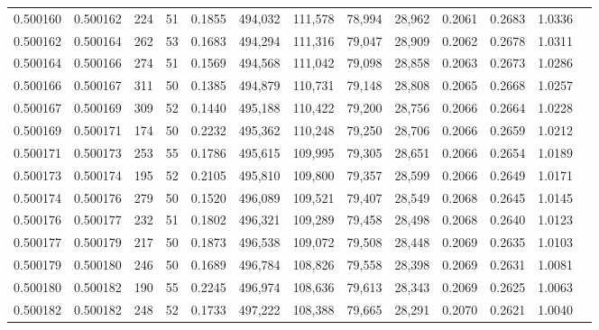 \begin{tabular}{rrrrrrrrrrrrr}
0.500160 & 0.500162 & 224 &  51 &                                     0.1855 & 494,032 & 111,578 &  78,994 &  28,962 & 0.2061 & 0.2683 & 1.0336 \\
0.500162 & 0.500164 & 262 &  53 &                                     0.1683 & 494,294 & 111,316 &  79,047 &  28,909 & 0.2062 & 0.2678 & 1.0311 \\
0.500164 & 0.500166 & 274 &  51 &                                     0.1569 & 494,568 & 111,042 &  79,098 &  28,858 & 0.2063 & 0.2673 & 1.0286 \\
0.500166 & 0.500167 & 311 &  50 &                                     0.1385 & 494,879 & 110,731 &  79,148 &  28,808 & 0.2065 & 0.2668 & 1.0257 \\
0.500167 & 0.500169 & 309 &  52 &                                     0.1440 & 495,188 & 110,422 &  79,200 &  28,756 & 0.2066 & 0.2664 & 1.0228 \\
0.500169 & 0.500171 & 174 &  50 &                                     0.2232 & 495,362 & 110,248 &  79,250 &  28,706 & 0.2066 & 0.2659 & 1.0212 \\
0.500171 & 0.500173 & 253 &  55 &                                     0.1786 & 495,615 & 109,995 &  79,305 &  28,651 & 0.2066 & 0.2654 & 1.0189 \\
0.500173 & 0.500174 & 195 &  52 &                                     0.2105 & 495,810 & 109,800 &  79,357 &  28,599 & 0.2066 & 0.2649 & 1.0171 \\
0.500174 & 0.500176 & 279 &  50 &                                     0.1520 & 496,089 & 109,521 &  79,407 &  28,549 & 0.2068 & 0.2645 & 1.0145 \\
0.500176 & 0.500177 & 232 &  51 &                                     0.1802 & 496,321 & 109,289 &  79,458 &  28,498 & 0.2068 & 0.2640 & 1.0123 \\
0.500177 & 0.500179 & 217 &  50 &                                     0.1873 & 496,538 & 109,072 &  79,508 &  28,448 & 0.2069 & 0.2635 & 1.0103 \\
0.500179 & 0.500180 & 246 &  50 &                                     0.1689 & 496,784 & 108,826 &  79,558 &  28,398 & 0.2069 & 0.2631 & 1.0081 \\
0.500180 & 0.500182 & 190 &  55 &                                     0.2245 & 496,974 & 108,636 &  79,613 &  28,343 & 0.2069 & 0.2625 & 1.0063 \\
0.500182 & 0.500182 & 248 &  52 &                                     0.1733 & 497,222 & 108,388 &  79,665 &  28,291 & 0.2070 & 0.2621 & 1.0040 \\

\end{tabular}
